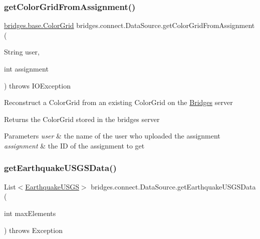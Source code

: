 \subsubsection{\texorpdfstring{getColorGridFromAssignment()}{getColorGridFromAssignment()}\hspace{0.1cm}{\footnotesize\ttfamily [2/2]}}
{\footnotesize\ttfamily \mbox{\hyperlink{classbridges_1_1base_1_1_color_grid}{bridges.\+base.\+Color\+Grid}} bridges.\+connect.\+Data\+Source.\+get\+Color\+Grid\+From\+Assignment (\begin{DoxyParamCaption}\item[{String}]{user,  }\item[{int}]{assignment }\end{DoxyParamCaption}) throws I\+O\+Exception}

Reconstruct a Color\+Grid from an existing Color\+Grid on the \mbox{\hyperlink{classbridges_1_1connect_1_1_bridges}{Bridges}} server

\begin{DoxyReturn}{Returns}
the Color\+Grid stored in the bridges server 
\end{DoxyReturn}

\begin{DoxyParams}{Parameters}
{\em user} & the name of the user who uploaded the assignment \\
\hline
{\em assignment} & the ID of the assignment to get \\
\hline
\end{DoxyParams}
\mbox{\label{classbridges_1_1connect_1_1_data_source_a96f3bb21fc1557dd2c6466dce6a30e7f}} 
\subsubsection{\texorpdfstring{getEarthquakeUSGSData()}{getEarthquakeUSGSData()}}
{\footnotesize\ttfamily List$<$\mbox{\hyperlink{classbridges_1_1data__src__dependent_1_1_earthquake_u_s_g_s}{Earthquake\+U\+S\+GS}}$>$ bridges.\+connect.\+Data\+Source.\+get\+Earthquake\+U\+S\+G\+S\+Data (\begin{DoxyParamCaption}\item[{int}]{max\+Elements }\end{DoxyParamCaption}) throws Exception}

